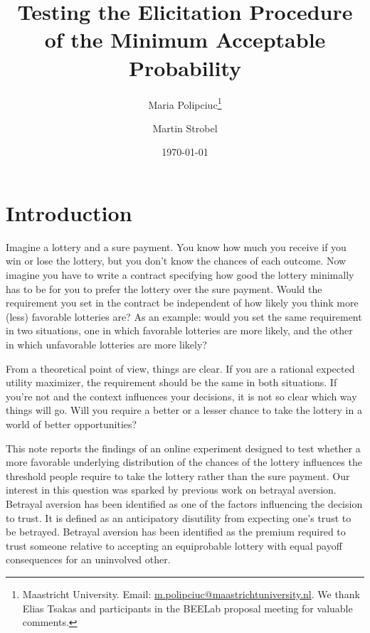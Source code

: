 
\title{Testing the Elicitation Procedure \\ of the Minimum Acceptable Probability}
\author{Maria Polipciuc\thanks{Maastricht University. Email: \url{m.polipciuc@maastrichtuniversity.nl}. We thank Elias Tsakas and participants in the BEELab proposal meeting for valuable comments.} \and Martin Strobel\footnotemark[1]}
\date{\today	\vspace{1cm}}
\titlepage



\begin{titlepage}
\clearpage
\maketitle
\thispagestyle{empty}


\begin{abstract}

\end{abstract}
\end{titlepage}


\section{Introduction}\label{sec:intro}



Imagine a lottery and a sure payment.
You know how much you receive if you win or lose the lottery, but you don't know the chances of each outcome.
Now imagine you have to write a contract specifying how good the lottery minimally has to be for you to prefer the lottery over the sure payment.
Would the requirement you set in the contract be independent of how likely you think more (less) favorable lotteries are?
As an example: would you set the same requirement in two situations, one in which favorable lotteries are more likely, and the other in which unfavorable lotteries are more likely?

From a theoretical point of view, things are clear.
If you are a rational expected utility maximizer, the requirement should be the same in both situations.
If you're not and the context influences your decisions, it is not so clear which way things will go.
Will you require a better or a lesser chance to take the lottery in a world of better opportunities?

This note reports the findings of an online experiment designed to test whether a more favorable underlying distribution of the chances of the lottery influences the threshold people require to take the lottery rather than the sure payment.
Our interest in this question was sparked by previous work on betrayal aversion.
Betrayal aversion has been identified as one of the factors influencing the decision to trust.
It is defined as an anticipatory disutility from expecting one's trust to be betrayed.
Betrayal aversion has been identified as the premium required to trust someone relative to accepting an equiprobable lottery with equal payoff consequences for an uninvolved other.


